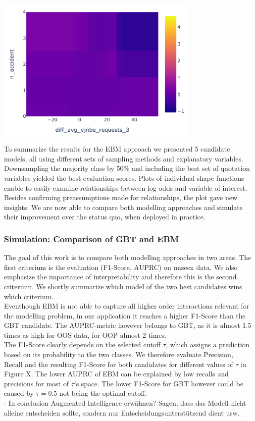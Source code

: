 \documentclass[12pt,titlepage]{article}
\begin{document}
\centerline{\includegraphics[height=7cm]{shape_2dim.png}}
To summarize the results for the EBM approach we presented 5 candidate models, all using different sets of sampling methods and explanatory variables. Downsampling the majority class by 50\% and including the best set of quotation variables yielded the best evaluation scores. Plots of individual shape functions enable to easily examine relationships between log odds and variable of interest. Besides confirming preassumptions made for relationships, the plot gave new insights. We are now able to compare both modelling approaches and simulate their improvement over the status quo, when deployed in practice. \\

\subsubsection*{Simulation: Comparison of GBT and EBM}

The goal of this work is to compare both modelling approaches in two areas. The first criterium is the evaluation (F1-Score, AUPRC) on unseen data. We also emphasize the importance of interpretability and therefore this is the second criterium. We shortly summarize which model of the two best candidates wins which criterium. \\
Eventhough EBM is not able to capture all higher order interactions relevant for the modelling problem, in our application it reaches a higher F1-Score than the GBT candidate. The AUPRC-metric however belongs to GBT, as it is almost 1.5 times as high for OOS data, for OOP almost 2 times. \\
The F1-Score clearly depends on the selected cutoff $\tau$, which assigns a prediction based on its probability to the two classes. We therefore evaluate Precision, Recall and the resulting F1-Score for both candidates for different values of $\tau$ in Figure X. The lower AUPRC of EBM can be explained by low recalls and precisions for most of $\tau$'s space. The lower F1-Score for GBT however could be caused by $\tau=0.5$ not being the optimal cutoff. \\


- In conclusion Augmented Intelligence erwähnen? Sagen, dass das Modell nicht alleine entscheiden sollte, sondern nur Entscheidungsunterstützend dient usw.
\newpage

\thispagestyle{empty}

\printbibliography

\vspace*{6mm}
\end{document}
